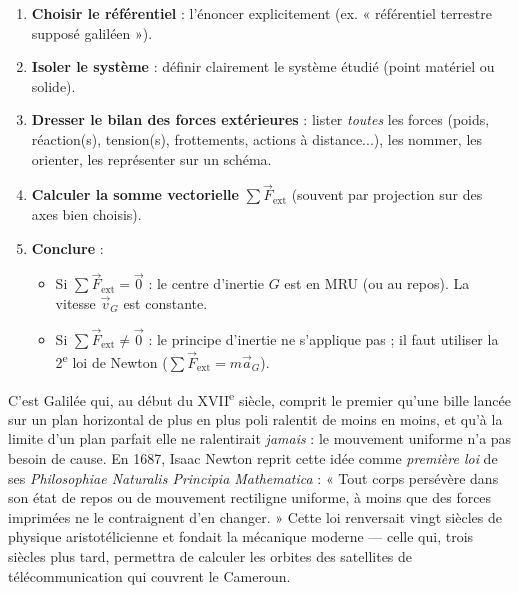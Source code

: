 \documentclass[11pt]{article}
\begin{document}
\begin{methode}
\begin{enumerate}
\item \textbf{Choisir le référentiel} : l'énoncer explicitement (ex. « référentiel terrestre supposé galiléen »).
\item \textbf{Isoler le système} : définir clairement le système étudié (point matériel ou solide).
\item \textbf{Dresser le bilan des forces extérieures} : lister \emph{toutes} les forces (poids, réaction(s), tension(s), frottements, actions à distance...), les nommer, les orienter, les représenter sur un schéma.
\item \textbf{Calculer la somme vectorielle} $\sum \vec{F}_{\text{ext}}$ (souvent par projection sur des axes bien choisis).
\item \textbf{Conclure} :
\begin{itemize}
\item Si $\sum \vec{F}_{\text{ext}} = \vec{0}$ : le centre d'inertie $G$ est en MRU (ou au repos). La vitesse $\vec{v}_G$ est constante.
\item Si $\sum \vec{F}_{\text{ext}} \neq \vec{0}$ : le principe d'inertie ne s'applique pas ; il faut utiliser la 2\textsuperscript{e} loi de Newton ($\sum \vec{F}_{\text{ext}} = m\vec{a}_G$).
\end{itemize}
\end{enumerate}
\end{methode}

\begin{savaistu}
C'est Galilée qui, au début du XVII\textsuperscript{e} siècle, comprit le premier qu'une bille lancée sur un plan horizontal de plus en plus poli ralentit de moins en moins, et qu'à la limite d'un plan parfait elle ne ralentirait \emph{jamais} : le mouvement uniforme n'a pas besoin de cause. En 1687, Isaac Newton reprit cette idée comme \emph{première loi} de ses \emph{Philosophiae Naturalis Principia Mathematica} : « Tout corps persévère dans son état de repos ou de mouvement rectiligne uniforme, à moins que des forces imprimées ne le contraignent d'en changer. » Cette loi renversait vingt siècles de physique aristotélicienne et fondait la mécanique moderne — celle qui, trois siècles plus tard, permettra de calculer les orbites des satellites de télécommunication qui couvrent le Cameroun.
\end{savaistu}
\end{document}
